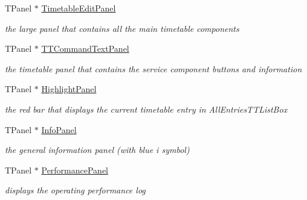\begin{DoxyCompactItemize}
T\+Panel $\ast$ \mbox{\hyperlink{class_t_interface_a99b9c15c11d2620c255966f62b2b9226}{Timetable\+Edit\+Panel}}
\begin{DoxyCompactList}\small\item\em the large panel that contains all the main timetable components \end{DoxyCompactList}\item 
\mbox{\label{class_t_interface_a56dc400de815cde20ab164f65d4a57e8}} 
T\+Panel $\ast$ \mbox{\hyperlink{class_t_interface_a56dc400de815cde20ab164f65d4a57e8}{T\+T\+Command\+Text\+Panel}}
\begin{DoxyCompactList}\small\item\em the timetable panel that contains the service component buttons and information \end{DoxyCompactList}\item 
\mbox{\label{class_t_interface_abd2c189b2bb0ca543d7fcd3082ddcddb}} 
T\+Panel $\ast$ \mbox{\hyperlink{class_t_interface_abd2c189b2bb0ca543d7fcd3082ddcddb}{Highlight\+Panel}}
\begin{DoxyCompactList}\small\item\em the red bar that displays the current timetable entry in All\+Entries\+T\+T\+List\+Box \end{DoxyCompactList}\item 
\mbox{\label{class_t_interface_aa8f9a87d19b3695023f99fdc8e1c650a}} 
T\+Panel $\ast$ \mbox{\hyperlink{class_t_interface_aa8f9a87d19b3695023f99fdc8e1c650a}{Info\+Panel}}
\begin{DoxyCompactList}\small\item\em the general information panel (with blue \textquotesingle{}i\textquotesingle{} symbol) \end{DoxyCompactList}\item 
\mbox{\label{class_t_interface_a4801769eef6bace140a5fddc5edf58e6}} 
T\+Panel $\ast$ \mbox{\hyperlink{class_t_interface_a4801769eef6bace140a5fddc5edf58e6}{Performance\+Panel}}
\begin{DoxyCompactList}\small\item\em displays the operating performance log \end{DoxyCompactList}\item 
\mbox{\label{class_t_interface_a94de13b77e51b4894755d1564d812cda}} 

\end{DoxyCompactItemize}
